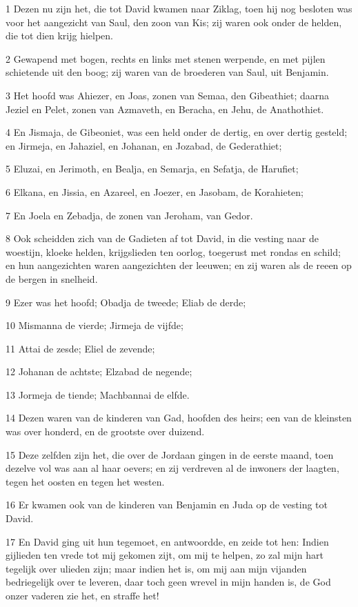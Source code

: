 \par 1 Dezen nu zijn het, die tot David kwamen naar Ziklag, toen hij nog besloten was voor het aangezicht van Saul, den zoon van Kis; zij waren ook onder de helden, die tot dien krijg hielpen.
\par 2 Gewapend met bogen, rechts en links met stenen werpende, en met pijlen schietende uit den boog; zij waren van de broederen van Saul, uit Benjamin.
\par 3 Het hoofd was Ahiezer, en Joas, zonen van Semaa, den Gibeathiet; daarna Jeziel en Pelet, zonen van Azmaveth, en Beracha, en Jehu, de Anathothiet.
\par 4 En Jismaja, de Gibeoniet, was een held onder de dertig, en over dertig gesteld; en Jirmeja, en Jahaziel, en Johanan, en Jozabad, de Gederathiet;
\par 5 Eluzai, en Jerimoth, en Bealja, en Semarja, en Sefatja, de Harufiet;
\par 6 Elkana, en Jissia, en Azareel, en Joezer, en Jasobam, de Korahieten;
\par 7 En Joela en Zebadja, de zonen van Jeroham, van Gedor.
\par 8 Ook scheidden zich van de Gadieten af tot David, in die vesting naar de woestijn, kloeke helden, krijgslieden ten oorlog, toegerust met rondas en schild; en hun aangezichten waren aangezichten der leeuwen; en zij waren als de reeen op de bergen in snelheid.
\par 9 Ezer was het hoofd; Obadja de tweede; Eliab de derde;
\par 10 Mismanna de vierde; Jirmeja de vijfde;
\par 11 Attai de zesde; Eliel de zevende;
\par 12 Johanan de achtste; Elzabad de negende;
\par 13 Jormeja de tiende; Machbannai de elfde.
\par 14 Dezen waren van de kinderen van Gad, hoofden des heirs; een van de kleinsten was over honderd, en de grootste over duizend.
\par 15 Deze zelfden zijn het, die over de Jordaan gingen in de eerste maand, toen dezelve vol was aan al haar oevers; en zij verdreven al de inwoners der laagten, tegen het oosten en tegen het westen.
\par 16 Er kwamen ook van de kinderen van Benjamin en Juda op de vesting tot David.
\par 17 En David ging uit hun tegemoet, en antwoordde, en zeide tot hen: Indien gijlieden ten vrede tot mij gekomen zijt, om mij te helpen, zo zal mijn hart tegelijk over ulieden zijn; maar indien het is, om mij aan mijn vijanden bedriegelijk over te leveren, daar toch geen wrevel in mijn handen is, de God onzer vaderen zie het, en straffe het!
